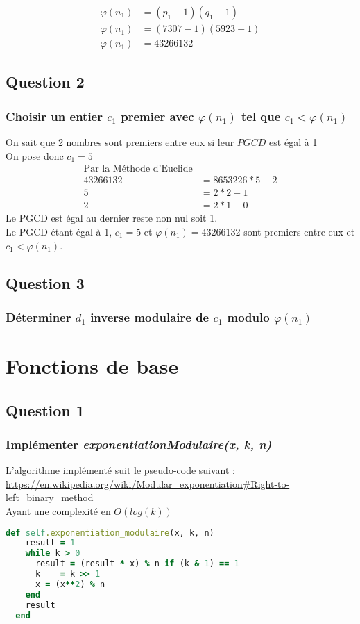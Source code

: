 \documentclass[a4paper,10pt]{article}
\begin{document}
\begin{align*}
\varphi(n_1) &= (p_1 - 1)(q_1 - 1)\\
\varphi(n_1) &= (7307 - 1)(5923 - 1)\\
\varphi(n_1) &= 43266132
\end{align*}

\subsection{Question 2}
\subsubsection{Choisir un entier $c_1$ premier avec $\varphi(n_1)$ tel que $c_1 < \varphi(n_1)$}
On sait que 2 nombres sont premiers entre eux si leur $PGCD$ est égal à 1\\
On pose donc $c_1 = 5$
\begin{align*}
\text{Par la Méthode d'Euclide}&\\
43266132 &= 8653226*5 + 2\\
5 &= 2*2 + 1\\
2 &= 2*1 + 0
\end{align*}
Le PGCD est égal au dernier reste non nul soit 1.\\ 
Le PGCD étant égal à 1, $c_1 = 5$ et $\varphi(n_1) = 43266132$ sont premiers entre eux et $c_1 < \varphi(n_1)$.

\subsection{Question 3}
\subsubsection{Déterminer $d_1$ inverse modulaire de $c_1$ modulo $\varphi(n_1)$}

\clearpage
\section{Fonctions de base}
\subsection{Question 1}
\subsubsection{Implémenter \textit{exponentiationModulaire(x, k, n)}}
L'algorithme implémenté suit le pseudo-code suivant :\\
 \url{https://en.wikipedia.org/wiki/Modular_exponentiation#Right-to-left_binary_method}\\
 Ayant une complexité en $O(log(k))$
\begin{lstlisting}[language=Ruby]
  def self.exponentiation_modulaire(x, k, n)
    result = 1
    while k > 0
      result = (result * x) % n if (k & 1) == 1
      k    = k >> 1
      x = (x**2) % n
    end
    result
  end
\end{lstlisting}
\end{document}
